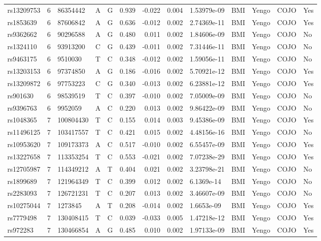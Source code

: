 \documentclass[11pt,twoside]{bristolthesis}
\begin{document}
\begin{longtable}[t]{lrlllrrrlllll}
rs13209753 & 6 & 86354442 & A & G & 0.939 & -0.022 & 0.004 & 1.53979e-09 & BMI & Yengo & COJO & Yes\\
rs1853639 & 6 & 87606842 & A & G & 0.636 & -0.012 & 0.002 & 2.74369e-11 & BMI & Yengo & COJO & Yes\\
rs9362662 & 6 & 90296588 & A & G & 0.480 & 0.011 & 0.002 & 1.84606e-09 & BMI & Yengo & COJO & No\\
rs1324110 & 6 & 93913200 & C & G & 0.439 & -0.011 & 0.002 & 7.31446e-11 & BMI & Yengo & COJO & No\\
\addlinespace
rs9463175 & 6 & 9510030 & T & C & 0.348 & -0.012 & 0.002 & 1.59056e-11 & BMI & Yengo & COJO & No\\
rs13203153 & 6 & 97374850 & A & G & 0.186 & -0.016 & 0.002 & 5.70921e-12 & BMI & Yengo & COJO & Yes\\
rs13209872 & 6 & 97753223 & C & G & 0.340 & -0.013 & 0.002 & 6.23881e-12 & BMI & Yengo & COJO & Yes\\
rs901630 & 6 & 98539519 & T & C & 0.397 & -0.010 & 0.002 & 7.05009e-09 & BMI & Yengo & COJO & No\\
rs9396763 & 6 & 9952059 & A & C & 0.220 & 0.013 & 0.002 & 9.86422e-09 & BMI & Yengo & COJO & No\\
\addlinespace
rs1048365 & 7 & 100804430 & T & C & 0.155 & 0.014 & 0.003 & 9.45386e-09 & BMI & Yengo & COJO & Yes\\
rs11496125 & 7 & 103417557 & T & C & 0.421 & 0.015 & 0.002 & 4.48156e-16 & BMI & Yengo & COJO & No\\
rs10953620 & 7 & 109173373 & A & C & 0.517 & -0.010 & 0.002 & 6.55457e-09 & BMI & Yengo & COJO & Yes\\
rs13227658 & 7 & 113353254 & T & C & 0.553 & -0.021 & 0.002 & 7.07238e-29 & BMI & Yengo & COJO & Yes\\
rs12705987 & 7 & 114349212 & A & T & 0.404 & 0.021 & 0.002 & 3.23798e-21 & BMI & Yengo & COJO & No\\
\addlinespace
rs1899689 & 7 & 121964349 & T & C & 0.399 & 0.012 & 0.002 & 6.1369e-14 & BMI & Yengo & COJO & No\\
rs2283093 & 7 & 126721231 & T & C & 0.207 & 0.013 & 0.002 & 3.46607e-09 & BMI & Yengo & COJO & No\\
rs10275044 & 7 & 1273845 & A & T & 0.208 & -0.014 & 0.002 & 1.6653e-09 & BMI & Yengo & COJO & Yes\\
rs7779498 & 7 & 130408415 & T & C & 0.039 & -0.033 & 0.005 & 1.47218e-12 & BMI & Yengo & COJO & Yes\\
rs972283 & 7 & 130466854 & A & G & 0.485 & 0.010 & 0.002 & 1.97133e-09 & BMI & Yengo & COJO & Yes\\

\end{longtable}
\end{document}
